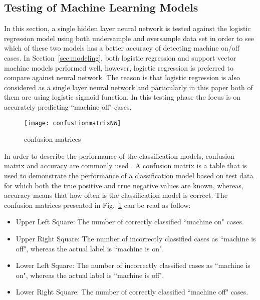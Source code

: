 \documentclass[runningheads]{llncs}
\begin{document}
\subsection{Testing of Machine Learning Models}
In this section, a single hidden layer neural network is tested against the logistic regression model using both undersample and oversample data set in order to see which of these two  models has a better accuracy of detecting machine on/off cases. In Section~\ref{sec:modeling}, both logistic regression and support vector machine models performed well, however, logictic regression is preferred to compare against neural network. The reason is that logistic regression is also considered as a single layer neural network and particularly in this paper both of them are using logistic sigmoid function. In this testing phase the focus is on accurately predicting ``machine off" cases.



\begin{figure}
\centering
\texttt{[image: confustionmatrixNW]} 
\caption{confusion matrices}
\label{fig:confusion4}
\end{figure}

In order to describe the performance of the classification models, confusion matrix and  accuracy are commonly used \cite{book}. A confusion matrix is a table that is used to demonstrate the performance of a classification model based on test data for which both the true positive and true negative values are known, whereas,  accuracy means that how often is the classification model is correct. The confusion matrices presented in Fig.~\ref{fig:confusion4} can be read as follow:

\begin{itemize} 
\item Upper Left Square: The number of correctly classified  ``machine on" cases.

\item  Upper Right Square: The number of incorrectly classified cases as ``machine is off", whereas the actual label is ``machine is on".

\item  Lower Left Square: The number of incorrectly classified cases as ``machine is on", whereas the actual label is ``machine is off".

\item Lower Right Square: The number of correctly classified  ``machine off" cases.
\end{itemize} 
\end{document}
